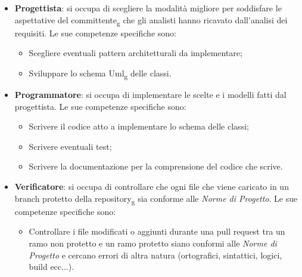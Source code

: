 \begin{itemize}
\item \textbf{Progettista}: si occupa di scegliere la modalità migliore per soddisfare le aspettative del committente\textsubscript{g} che gli analisti hanno ricavato dall'analisi dei requisiti. Le sue competenze specifiche sono:
\begin{itemize}
	\item Scegliere eventuali pattern architetturali da implementare;
	\item Sviluppare lo schema Uml\textsubscript{g} delle classi.
\end{itemize}

\item \textbf{Programmatore}: si occupa di implementare le scelte e i modelli fatti dal progettista. Le sue competenze specifiche sono:
\begin{itemize}
	\item Scrivere il codice atto a implementare lo schema delle classi;
	\item Scrivere eventuali test;
	\item Scrivere la documentazione per la comprensione del codice che scrive.
\end{itemize}

\item \textbf{Verificatore}: si occupa di controllare che ogni file che viene caricato in un branch protetto della repository\textsubscript{g} sia conforme alle \textit{Norme di Progetto}. Le sue competenze specifiche sono:
\begin{itemize}
	\item Controllare i file modificati o aggiunti durante una pull request tra un ramo non protetto e un ramo protetto siano conformi alle \textit{Norme di Progetto} e cercano errori di altra natura (ortografici, sintattici, logici, build ecc...).
\end{itemize}

\end{itemize}